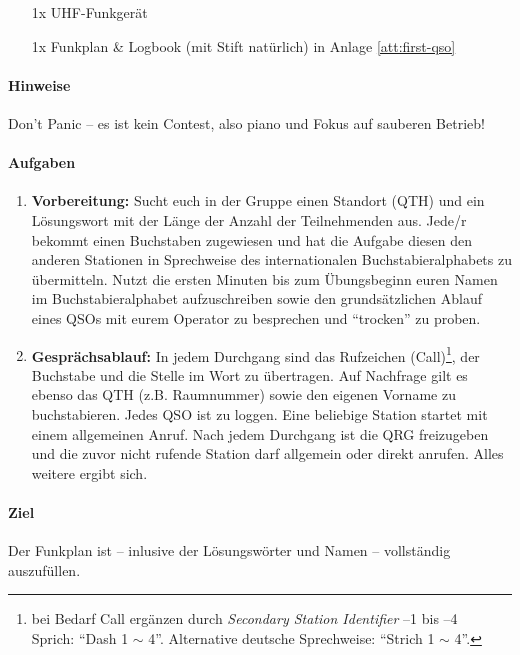 \begin{itemize}
  \item[1x] UHF-Funkgerät
  \item[1x] Funkplan \& Logbook (mit Stift natürlich) in Anlage \ref{att:first-qso}
\end{itemize}

\paragraph{Hinweise}

Don't Panic -- es ist kein Contest, also piano und Fokus auf sauberen Betrieb!


\paragraph{Aufgaben}

\begin{enumerate}
  \item \textbf{Vorbereitung:} Sucht euch in der Gruppe einen Standort (QTH) und ein
    Lösungswort mit der Länge der Anzahl der Teilnehmenden aus. Jede/r bekommt einen
    Buchstaben zugewiesen und hat die Aufgabe diesen den anderen Stationen in
    Sprechweise des internationalen Buchstabieralphabets zu übermitteln. Nutzt die
    ersten Minuten bis zum Übungsbeginn euren Namen im Buchstabieralphabet
    aufzuschreiben sowie den grundsätzlichen Ablauf eines QSOs mit eurem Operator zu
    besprechen und "`trocken"' zu proben.
  \item \textbf{Gesprächsablauf:} In jedem Durchgang sind das Rufzeichen
    (Call)\footnote{bei Bedarf Call ergänzen durch \emph{Secondary Station
    Identifier} --1 bis --4 \\ Sprich: ``Dash 1 $\sim$ 4''. Alternative deutsche
    Sprechweise: ``Strich 1 $\sim$ 4''.}, der Buchstabe und die Stelle im Wort
    zu übertragen. Auf Nachfrage gilt es ebenso das QTH (z.B.  Raumnummer) sowie
    den eigenen Vorname zu buchstabieren.  Jedes QSO ist zu loggen.  Eine
    beliebige Station startet mit einem allgemeinen Anruf. Nach jedem Durchgang
    ist die QRG freizugeben und die zuvor nicht rufende Station darf allgemein
    oder direkt anrufen. Alles weitere ergibt sich.
\end{enumerate}

\paragraph{Ziel} Der Funkplan ist -- inlusive der Lösungswörter und Namen --
vollständig auszufüllen.
